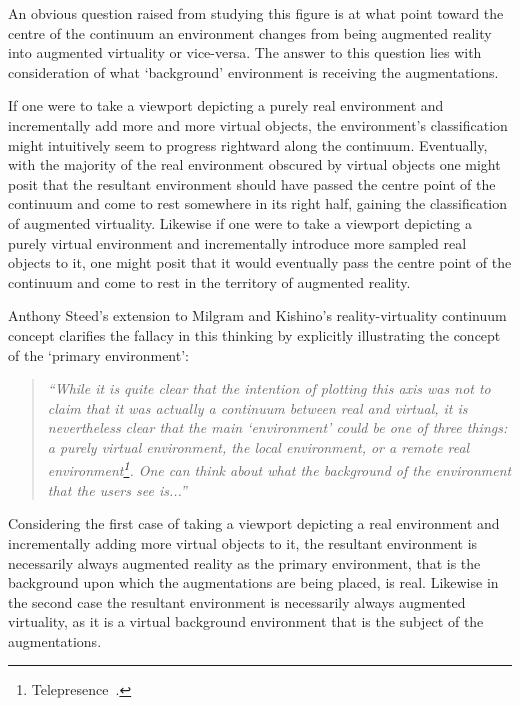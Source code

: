 An obvious question raised from studying this figure is at what point toward the centre of the continuum an environment changes from being augmented reality into augmented virtuality or vice-versa. The answer to this question lies with consideration of what `background' environment is receiving the augmentations.

If one were to take a viewport depicting a purely real environment and incrementally add more and more virtual objects, the environment's classification might intuitively seem to progress rightward along the continuum. Eventually, with the majority of the real environment obscured by virtual objects one might posit that the resultant environment should have passed the centre point of the continuum and come to rest somewhere in its right half, gaining the classification of augmented virtuality. Likewise if one were to take a viewport depicting a purely virtual environment and incrementally introduce more sampled real objects to it, one might posit that it would eventually pass the centre point of the continuum and come to rest in the territory of augmented reality.

Anthony Steed's extension to Milgram and Kishino's reality-virtuality continuum concept clarifies the fallacy in this thinking by explicitly illustrating the concept of the `primary environment':

\begin{quote}
\textit{``While it is quite clear that the intention of plotting this axis was not to claim that it was actually a continuum between real and virtual, it is nevertheless clear that the main `environment' could be one of three things: a purely virtual environment, the local environment, or a remote real environment\footnote{Telepresence~\cite{Sheridan1992a}.}. One can think about what the background of the environment that the users see is...''}~\cite{Steed2014}
\end{quote}

Considering the first case of taking a viewport depicting a real environment and incrementally adding more virtual objects to it, the resultant environment is necessarily always augmented reality as the primary environment, that is the background upon which the augmentations are being placed, is real. Likewise in the second case the resultant environment is necessarily always augmented virtuality, as it is a virtual background environment that is the subject of the augmentations.


